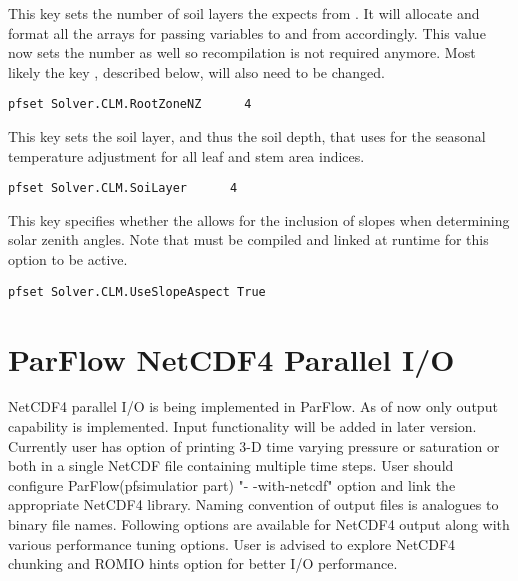 {This key sets the number of soil layers the \parflow{} expects from
  .  It will allocate and format all the arrays for passing
  variables to and from  accordingly.  This value now sets
  the  number as well so recompilation is not required anymore.
  Most likely the key , described
  below, will also need to be changed.}
\begin{display}\begin{verbatim}
pfset Solver.CLM.RootZoneNZ      4
\end{verbatim}\end{display}

{This key sets the soil layer, and thus the soil depth, that  uses for the seasonal temperature adjustment for all leaf and stem area indices.}
\begin{display}\begin{verbatim}
pfset Solver.CLM.SoiLayer      4
\end{verbatim}\end{display}
{This key specifies whether the  allows for the inclusion of slopes when determining solar zenith angles.
 Note that  must be compiled and linked at runtime for this option to be active.
}
\begin{display}\begin{verbatim}
pfset Solver.CLM.UseSlopeAspect True
\end{verbatim}\end{display}

\section{ParFlow NetCDF4 Parallel I/O}
\label{ParFlow NetCDF4 Parallel I/O}
NetCDF4 parallel I/O is being implemented in ParFlow. As of now only output capability is implemented. Input functionality will be added in later version. Currently user has option of printing 3-D time varying pressure or saturation or both in a single NetCDF file containing multiple time steps. User should configure ParFlow(pfsimulatior part) "- -with-netcdf" option and link the appropriate NetCDF4 library.
Naming convention of output files is analogues to binary file names. Following options are available for NetCDF4 output along with various performance tuning options. User is advised to explore NetCDF4 chunking and ROMIO hints option for better I/O performance.

